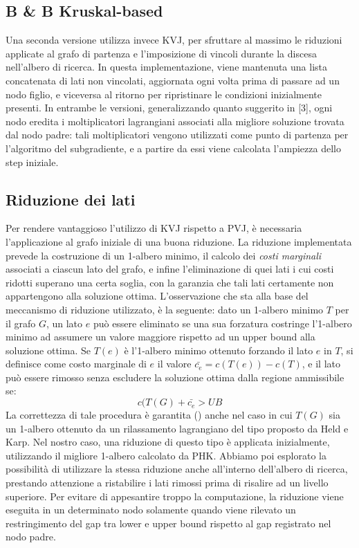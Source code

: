 \subsection{B \& B Kruskal-based}
Una seconda versione utilizza invece KVJ, per sfruttare al massimo le riduzioni applicate al grafo di partenza e l'imposizione di vincoli durante la discesa nell'albero di ricerca. In questa implementazione, viene mantenuta una lista concatenata di lati non vincolati, aggiornata ogni volta prima di passare ad un nodo figlio, e viceversa al ritorno per ripristinare le condizioni inizialmente presenti.
In entrambe le versioni, generalizzando quanto suggerito in [3], ogni nodo eredita i moltiplicatori lagrangiani associati alla migliore soluzione trovata dal nodo padre: tali moltiplicatori vengono utilizzati come punto di partenza per l'algoritmo del subgradiente, e a partire da essi viene calcolata l'ampiezza dello step iniziale.
\subsection{Riduzione dei lati}\label{sec:riduzionelati}
Per rendere vantaggioso l'utilizzo di KVJ rispetto a PVJ, è necessaria l'applicazione al grafo iniziale di una buona riduzione. La riduzione implementata prevede la costruzione di un 1-albero minimo, il calcolo dei \emph{costi marginali} associati a ciascun lato del grafo, e infine l'eliminazione di quei lati i cui costi ridotti superano una certa soglia, con la garanzia che tali lati certamente non appartengono alla soluzione ottima. L'osservazione che sta alla base del meccanismo di riduzione utilizzato, è la seguente: dato un 1-albero minimo $T$ per il grafo $G$, un lato $e$ può essere eliminato se una sua forzatura costringe l'1-albero minimo ad assumere un valore maggiore rispetto ad un upper bound alla soluzione ottima. Se $T(e)$ è l'1-albero minimo ottenuto forzando il lato $e$ in $T$, si definisce come costo marginale di $e$ il valore $\bar{c_e} = c(T(e)) - c(T)$, e il lato può essere rimosso senza escludere la soluzione ottima dalla regione ammissibile se:
\begin{equation}
c(T(G) + \bar{c_e} > UB
\end{equation}
La correttezza di tale procedura è garantita (\citep{benchimol2010improving,benchimol2012improved}) anche nel caso in cui $T(G)$ sia un 1-albero ottenuto da un rilassamento lagrangiano del tipo proposto da Held e Karp. Nel nostro caso, una riduzione di questo tipo è applicata inizialmente, utilizzando il migliore 1-albero calcolato da PHK. Abbiamo poi esplorato la possibilità di utilizzare la stessa riduzione anche all'interno dell'albero di ricerca, prestando attenzione a ristabilire i lati rimossi prima di risalire ad un livello superiore. Per evitare di appesantire troppo la computazione, la riduzione viene eseguita in un determinato nodo solamente quando viene rilevato un restringimento del gap tra lower e upper bound rispetto al gap registrato nel nodo padre.
